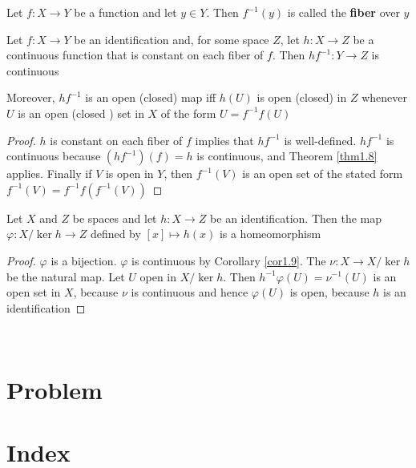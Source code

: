 \documentclass[11pt]{article}
\begin{document}
\begin{definition}[]
Let \(f:X\to Y\) be a function and let \(y\in Y\). Then \(f^{-1}(y)\) is called the \textbf{fiber} over \(y\)
\end{definition}

\begin{corollary}[]
\label{cor1.9}
Let \(f:X\to Y\) be an identification and, for some space \(Z\), let \(h:X\to Z\) be a continuous
function that is constant on each fiber of \(f\). Then \(hf^{-1}:Y\to Z\) is continuous
\begin{center}\end{center}
Moreover, \(hf^{-1}\) is an open (closed) map iff \(h(U)\) is open (closed) in \(Z\)
whenever \(U\) is an open (closed ) set in \(X\) of the form \(U=f^{-1}f(U)\)
\end{corollary}

\begin{proof}
\(h\) is constant on each fiber of \(f\) implies that \(hf^{-1}\) is well-defined. \(hf^{-1}\) is
continuous because \((hf^{-1})(f)=h\) is continuous, and Theorem \ref{thm1.8} applies. Finally
if \(V\) is open in \(Y\), then \(f^{-1}(V)\) is an open set of the stated form \(f^{-1}(V)=f^{-1}f(f^{-1}(V))\)
\end{proof}

\begin{corollary}[]
Let \(X\) and \(Z\) be spaces and let \(h:X\to Z\) be an identification. Then the
map \(\varphi:X/\ker h\to Z\) defined by \([x]\mapsto h(x)\) is a homeomorphism
\end{corollary}

\begin{proof}
\(\varphi\) is a bijection. \(\varphi\) is continuous by Corollary \ref{cor1.9}. The \(\nu:X\to X/\ker h\) be the natural
map. Let \(U\) open in \(X/\ker h\). Then \(h^{-1}\varphi(U)=\nu^{-1}(U)\) is an open set in \(X\),
because \(\nu\) is continuous and hence \(\varphi(U)\) is open, because \(h\) is an identification
\end{proof}
​
\section{Problem}
\label{sec:org8d2d4fd}
\label{Problem1}

\label{Problem2}

\section{Index}
\label{sec:org13604c8}
\renewcommand{\indexname}{}
\printindex
\end{document}
